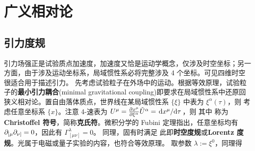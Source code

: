 \section{广义相对论}
\subsection{引力度规}

引力场强正是试验质点加速度，加速度又恰是运动学概念，仅涉及时空坐标；另一方面，由于涉及运动坐标系，局域惯性系必将完整涉及 4 个坐标。可见四维时空很适合用于描述引力。
先考虑试验粒子在外场中的运动。根据等效原理，试验粒子的\textbf{最小引力耦合}(minimal gravitational coupling)即要求在局域惯性系中还原回狭义相对论。置自由落体质点，世界线在某局域惯性系 $\{\xi\}$ 中表为 $\xi^\alpha(\tau)$，则
考虑任意坐标系 $\{x\}$。注意 4-速表为 $U^\mu=\pdv{x^\mu}{\xi^\alpha}\tilde U^\alpha=\dv*{x^\mu}{\tau}$，则
其中
称为\textbf{Christoffel 符号}，简称\textbf{克氏符}。微积分学的 Fubini 定理指出，任意坐标均有 $\partial_{[\mu}\partial_{\nu]}=0$，因此有 $\Gamma^\lambda_{[\mu\nu]}=0$。
同理，固有时满足
此即\textbf{时空度规}或\textbf{Lorentz 度规}。光属于电磁或量子实验的内容，也符合等效原理。
取参数 $\lambda:=\xi^0$，同理得

